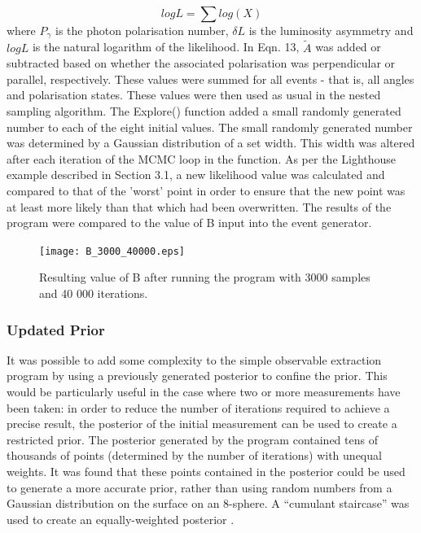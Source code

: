 \documentclass[a4paper,12pt]{article}
\begin{document}
\begin{equation}
logL = \sum log(X)
\end{equation}
where $P_{\gamma}$ is the photon polarisation number, $\delta L$ is the luminosity asymmetry and $logL$ is the natural logarithm of the likelihood.  In Eqn. 13, %
$\tilde{A}$ was added or subtracted based on whether the associated polarisation was perpendicular or parallel, respectively.  These values were summed for all events - that is, all angles and polarisation states.  
\newline
These values were then used as usual in the nested sampling algorithm.  The Explore() function added a small randomly generated number to each of the eight initial values.  The small randomly generated number was determined by a Gaussian distribution of a set width.  This width was altered after each iteration of the MCMC loop in the function.  As per the Lighthouse example described in Section 3.1, a new likelihood value was calculated and compared to that of the 'worst' point in order to ensure that the new point was at least more likely than that which had been overwritten.  The results of the program were compared to the value of B input into the event generator.


\begin{figure}[!h]
 \begin{center}
  \texttt{[image: B\_3000\_40000.eps]}
  \caption{Resulting value of B after running the program with 3000 samples and 40 000 iterations.}
 \end{center}
\end{figure}


\subsubsection{Updated Prior}
It was possible to add some complexity to the simple observable extraction program by using a previously generated posterior to confine the prior.  This would be particularly useful in the case where two or more measurements have been taken: in order to reduce the number of iterations required to achieve a precise result, the posterior of the initial measurement can be used to create a restricted prior.  The posterior generated by the program contained tens of thousands of points (determined by the number of iterations) with unequal weights.  It was found that these points contained in the posterior could be used to generate a more accurate prior, rather than using random numbers from a Gaussian distribution on the surface on an 8-sphere.  A ``cumulant staircase'' was used to create an equally-weighted posterior \cite{sivia}.
\end{document}
